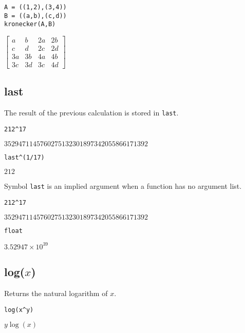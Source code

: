 {\color{blue}
\begin{verbatim}
A = ((1,2),(3,4))
B = ((a,b),(c,d))
kronecker(A,B)
\end{verbatim}
}

\noindent
$\displaystyle
\begin{bmatrix}
a & b & 2a & 2b
\\[1ex]
c & d & 2c & 2d
\\[1ex]
3a & 3b & 4a & 4b
\\[1ex]
3c & 3d & 3c & 4d
\end{bmatrix}
$

\subsection*{last}

The result of the previous calculation is stored in {\tt last}.

{\color{blue}
\begin{verbatim}
212^17
\end{verbatim}
}

\noindent
$3529471145760275132301897342055866171392$

{\color{blue}
\begin{verbatim}
last^(1/17)
\end{verbatim}
}

\noindent
$212$

\bigskip
\noindent
Symbol \verb$last$ is an implied argument when a function has no argument list.

{\color{blue}
\begin{verbatim}
212^17
\end{verbatim}
}

\noindent
$3529471145760275132301897342055866171392$

{\color{blue}
\begin{verbatim}
float
\end{verbatim}
}

\noindent
$\displaystyle 3.52947\times10^{39}$

\subsection*{log($x$)}

Returns the natural logarithm of $x$.

{\color{blue}
\begin{verbatim}
log(x^y)
\end{verbatim}
}

\noindent
$y\log(x)$

